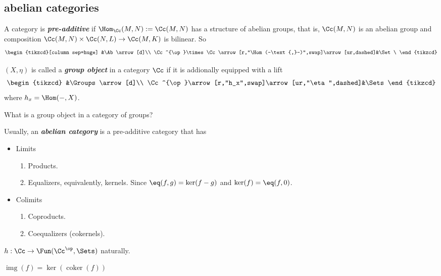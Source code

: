 \subsection{abelian categories}
\begin{defn}
	A category is \textbf{\textit{pre-additive}} if $\Hom_\Cc(M,N):=\Cc(M,N)$ has a structure of abelian groups, that is, $\Cc(M,N)$ is an abelian group and composition $\Cc(M,N)\times\Cc(N,L)\to\Cc(M,K)$ is bilinear. So
	\[\begin{tikzcd}[column sep=huge]
		&\Ab\arrow[d]\\
	\Cc^{\op}\times\Cc\arrow[r,"\Hom(-\text{,}-)",swap]\arrow[ur,dashed]&\Set
\	\end{tikzcd}\]
\end{defn}
\begin{defn}
	$(X,\eta)$ is called a \textbf{\textit{group object}} in a category $\Cc$ if it is addionally equipped with a lift
	\[\begin{tikzcd}
		&\Groups\arrow[d]\\		\Cc^{\op}\arrow[r,"h_x",swap]\arrow[ur,"\eta",dashed]&\Sets
	\end{tikzcd}\]
	where $h_x=\Hom(-,X)$.
\end{defn}
\begin{exercise}
	What is a group object in a category of groups?
\end{exercise}
\begin{defn}
	Usually, an \textbf{\textit{abelian category}} is a pre-additive category that has
	\begin{itemize}
		\item Limits
		\begin{enumerate}
			\item Products.
			\item Equalizers, equivalently, kernels. Since $\eq(f,g)=\ker(f-g)$ and $\ker(f)=\eq(f,0)$.
		\end{enumerate}
		\item Colimits
		\begin{enumerate}
			\item Coproducts.
			\item Coequalizers (cokernels).
		\end{enumerate}
	\end{itemize}
\end{defn}
\begin{lemma}[Yoneda]
	$h:\Cc\to\Fun(\Cc^{\op},\Sets)$ naturally.
\end{lemma}
\begin{defn}
	$\operatorname{img}(f)=\ker(\operatorname{coker}(f))$
\end{defn}

